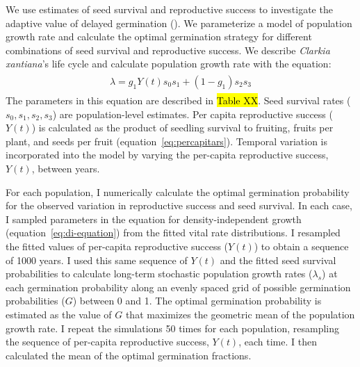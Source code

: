 \documentclass[12pt, oneside, titlepage]{article}   	%
\begin{document}
We use estimates of seed survival and reproductive success to investigate the adaptive value of delayed germination (\cite{gremer2014}). We parameterize a model of population growth rate and calculate the optimal germination strategy for different combinations of seed survival and reproductive success. We describe \textit{Clarkia xantiana}'s life cycle and calculate population growth rate with the equation:
%
\begin{align}
  \begin{split}
\lambda = g_1 Y(t) s_0 s_1  + (1-g_1) s_2 s_3  \label{eq:di-equation}
  \end{split}
\end{align}
%
The parameters in this equation are described in \hl{Table XX}. Seed survival rates ($s_0, s_1, s_2, s_3$) are population-level estimates. Per capita reproductive success ($Y(t)$) is calculated as the product of seedling survival to fruiting, fruits per plant, and seeds per fruit (equation~\eqref{eq:percapitars}). Temporal variation is incorporated into the model by varying the per-capita reproductive success, $Y(t)$, between years.

For each population, I numerically calculate the optimal germination probability for the observed variation in reproductive success and seed survival. In each case, I sampled parameters in the equation for density-independent growth (equation~\eqref{eq:di-equation}) from the fitted vital rate distributions. I resampled the fitted values of per-capita reproductive success ($Y(t)$) to obtain a sequence of 1000 years. I used this same sequence of $Y(t)$ and the fitted seed survival probabilities to calculate long-term stochastic population growth rates ($\lambda_s$) at each germination probability along an evenly spaced grid of possible germination probabilities ($G$) between 0 and 1. The optimal germination probability is estimated as the value of $G$ that maximizes the geometric mean of the population growth rate. I repeat the simulations 50 times for each population, resampling the sequence of per-capita reproductive success, $Y(t)$, each time. I then calculated the mean of the optimal germination fractions.  

\end{document}

